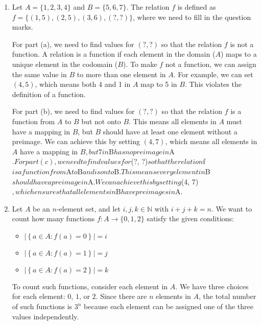 \documentclass{article}
\theoremstyle{definition}
\begin{document}
\begin{solution}
\begin{enumerate}
    \item Let $A = \{1, 2, 3, 4\}$ and $B = \{5, 6, 7\}$. The relation $f$ is defined as $f = \{(1, 5), (2, 5), (3, 6), (?, ?)\}$, where we need to fill in the question marks.

    For part (a), we need to find values for $(?, ?)$ so that the relation $f$ is not a function. A relation is a function if each element in the domain ($A$) maps to a unique element in the codomain ($B$). To make $f$ not a function, we can assign the same value in $B$ to more than one element in $A$. For example, we can set $(4, 5)$, which means both 4 and 1 in $A$ map to 5 in $B$. This violates the definition of a function.

    For part (b), we need to find values for $(?, ?)$ so that the relation $f$ is a function from $A$ to $B$ but not onto $B$. This means all elements in $A$ must have a mapping in $B$, but $B$ should have at least one element without a preimage. We can achieve this by setting $(4, 7)$, which means all elements in $A$ have a mapping in $B, but 7 in $B$ has no preimage in $A$.

    For part (c), we need to find values for $(?, ?)$ so that the relation $f$ is a function from $A$ to $B$ and is onto $B$. This means every element in $B$ should have a preimage in $A$. We can achieve this by setting $(4, 7)$, which ensures that all elements in $B$ have preimages in $A.

    \item Let $A$ be an $n$-element set, and let $i, j, k \in \mathbb{N}$ with $i + j + k = n$. We want to count how many functions $f \colon A \to \{0, 1, 2\}$ satisfy the given conditions:

    \begin{itemize}
        \item $\left|\left\{ a \in A : f(a) = 0 \right\} \right| = i$
        \item $\left|\left\{ a \in A : f(a) = 1 \right\} \right| = j$
        \item $\left|\left\{ a \in A : f(a) = 2 \right\} \right| = k$
    \end{itemize}

    To count such functions, consider each element in $A$. We have three choices for each element: $0$, $1$, or $2$. Since there are $n$ elements in $A$, the total number of such functions is $3^n$ because each element can be assigned one of the three values independently. 

\end{enumerate}
\end{solution}
\end{document}
